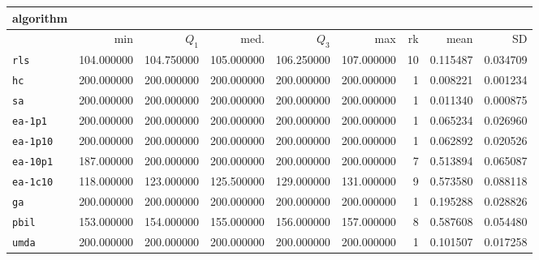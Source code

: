\begin{center}
\begin{tabular}{@{}l*{5}{>{{}}N{3}{0}}>{{}}N{2}{0}N{1}{3}N{1}{3}@{}}
\toprule
{algorithm} &  &  \\
\midrule
& {min} & {$Q_1$} & {med.} & {$Q_3$} & {max} & {rk} & {mean} & {SD} \\
\midrule
\verb|rls| & 104.000000 & 104.750000 & 105.000000 & 106.250000 & 107.000000 & 10 & 0.115487 & 0.034709 \\
 \verb|hc| & {\color{blue}} 200.000000 & {\color{blue}} 200.000000 & {\color{blue}} 200.000000 & {\color{blue}} 200.000000 & {\color{blue}} 200.000000 & 1 & 0.008221 & 0.001234 \\
 \verb|sa| & {\color{blue}} 200.000000 & {\color{blue}} 200.000000 & {\color{blue}} 200.000000 & {\color{blue}} 200.000000 & {\color{blue}} 200.000000 & 1 & 0.011340 & 0.000875 \\
 \verb|ea-1p1| & {\color{blue}} 200.000000 & {\color{blue}} 200.000000 & {\color{blue}} 200.000000 & {\color{blue}} 200.000000 & {\color{blue}} 200.000000 & 1 & 0.065234 & 0.026960 \\
 \verb|ea-1p10| & {\color{blue}} 200.000000 & {\color{blue}} 200.000000 & {\color{blue}} 200.000000 & {\color{blue}} 200.000000 & {\color{blue}} 200.000000 & 1 & 0.062892 & 0.020526 \\
 \verb|ea-10p1| & 187.000000 & {\color{blue}} 200.000000 & {\color{blue}} 200.000000 & {\color{blue}} 200.000000 & {\color{blue}} 200.000000 & 7 & 0.513894 & 0.065087 \\
 \verb|ea-1c10| & 118.000000 & 123.000000 & 125.500000 & 129.000000 & 131.000000 & 9 & 0.573580 & 0.088118 \\
 \verb|ga| & {\color{blue}} 200.000000 & {\color{blue}} 200.000000 & {\color{blue}} 200.000000 & {\color{blue}} 200.000000 & {\color{blue}} 200.000000 & 1 & 0.195288 & 0.028826 \\
 \verb|pbil| & 153.000000 & 154.000000 & 155.000000 & 156.000000 & 157.000000 & 8 & 0.587608 & 0.054480 \\
 \verb|umda| & {\color{blue}} 200.000000 & {\color{blue}} 200.000000 & {\color{blue}} 200.000000 & {\color{blue}} 200.000000 & {\color{blue}} 200.000000 & 1 & 0.101507 & 0.017258 \\
 \bottomrule
\end{tabular}
\end{center}

